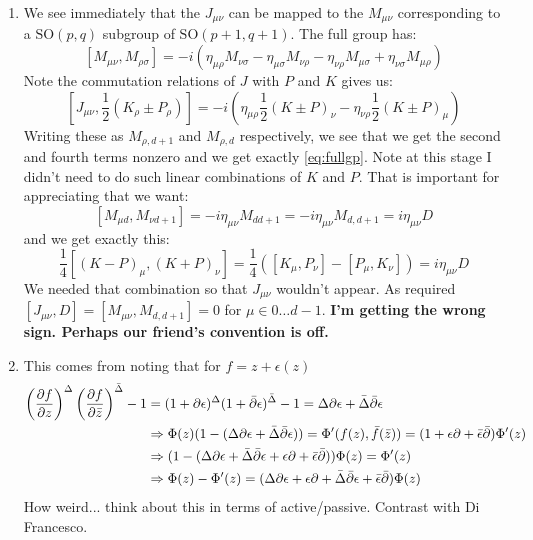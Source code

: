 \documentclass[11pt]{article}
\begin{document}
\begin{enumerate}
	\item
	We see immediately that the $J_{\mu \nu}$ can be mapped to the $M_{\mu \nu}$ corresponding to a $\mathrm{SO}(p, q)$ subgroup of $\mathrm{SO}(p+1, q+1)$. The full group has:
	\begin{equation}\label{eq:fullgp}
		[M_{\mu \nu}, M_{\rho \sigma}]= -i (\eta_{\mu \rho} M_{\nu \sigma} - \eta_{\mu \sigma} M_{\nu \rho} - \eta_{\nu \rho} M_{\mu \sigma} + \eta_{\nu \sigma} M_{\mu \rho})
	\end{equation}
	 Note the commutation relations of $J$ with $P$ and $K$ gives us:
	\[
		[J_{\mu \nu}, \frac12(K_\rho \pm P_\rho) ] = -i \left( \eta_{\mu \rho} \frac12 (K \pm P)_\nu - \eta_{\nu \rho} \frac12 (K \pm P)_\mu \right)
	\]
	Writing these as $M_{\rho, d+1}$ and $M_{\rho, d}$ respectively, we see that we get the second and fourth terms nonzero and we get exactly \eqref{eq:fullgp}. Note at this stage I didn't need to do such linear combinations of $K$ and $P$. That is important for appreciating that we want:
	\[
		[M_{\mu d}, M_{\nu d+1}] = -i \eta_{\mu \nu} M_{d d+1} = - i \eta_{\mu \nu} M_{d, d+1} = i \eta_{\mu \nu} D
	\]
	and we get exactly this:
	\[
		\frac14 [(K-P)_\mu, (K + P)_\nu] = \frac14 ([K_\mu, P_\nu] - [P_\mu, K_\nu]) = i \eta_{\mu \nu} D
	\]
	We needed that combination so that $J_{\mu \nu}$ wouldn't appear. As required $[J_{\mu \nu}, D] = [M_{\mu \nu}, M_{d, d+1}]=0$ for $\mu \in 0 \dots d-1$. 
	\textbf{I'm getting the wrong sign. Perhaps our friend's convention is off.}

	\item This comes from noting that for $f = z + \epsilon(z)$
	\[
	\begin{aligned}
		\left(\frac{\partial f}{\partial z}\right)^{\Delta} \left(\frac{\partial f}{\partial \bar z}\right)^{\bar \Delta} - 1 &= (1 + \partial \epsilon)^{\Delta}(1 + \bar \partial \epsilon)^{\bar \Delta} - 1 = \Delta \partial \epsilon + \bar \Delta \bar \partial \epsilon\\ & \Rightarrow \Phi(z) (1 - (\Delta \partial \epsilon + \bar \Delta \bar \partial \epsilon)) = \Phi'(f(z), \bar f(\bar z)) = (1 + \epsilon \partial + \bar \epsilon \bar {\partial}) \Phi'(z)\\
		&\Rightarrow (1 - (\Delta \partial \epsilon + \bar \Delta \bar \partial \epsilon + \epsilon \partial + \bar \epsilon \bar {\partial}) ) \Phi(z) = \Phi'(z)\\
		&\Rightarrow \Phi(z) - \Phi'(z) = (\Delta \partial \epsilon + \epsilon \partial + \bar \Delta \bar \partial \epsilon + \bar \epsilon \bar {\partial} ) \Phi(z)
	\end{aligned}
	\]
	How weird... think about this in terms of active/passive. Contrast with Di Francesco. 
	

\end{enumerate}
\end{document}
